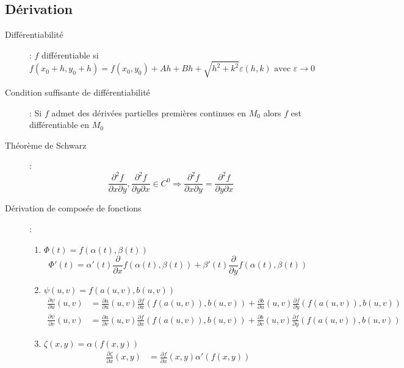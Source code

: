 \subsection{Dérivation}
\begin{description}
\item[Différentiabilité] : $f$ différentiable si
    \[
        f(x_0+h,y_0+h)=
        f(x_0,y_0)+Ah+Bh+\sqrt{h^2+k^2}\varepsilon(h,k)
        \textrm{ avec }
        \varepsilon\longrightarrow 0
    \]
\item[Condition suffisante de différentiabilité] : Si $f$ admet des dérivées partielles premières continues en $M_0$
    alors $f$ est différentiable en $M_0$
\item[Théorème de Schwarz] :
    \[
        \frac{\partial^2f}{\partial x\partial y},
        \frac{\partial^2f}{\partial y\partial x}
        \in C^0
        \Rightarrow
        \frac{\partial^2f}{\partial x\partial y}=
        \frac{\partial^2f}{\partial y\partial x}
    \]
\item[Dérivation de composée de fonctions] :
\begin{enumerate}
    \item $\Phi(t)=f(\alpha(t),\beta(t))$
        \[
            \Phi'(t)=
            \alpha'(t)\frac{\partial}{\partial x}
            f(\alpha(t),\beta(t))
            +
            \beta'(t)\frac{\partial}{\partial y}
            f(\alpha(t),\beta(t))
        \]
    \item $\psi(u,v)=f(a(u,v),b(u,v))$
        \begin{align*}
            \frac{\partial\psi}{\partial u}(u,v)
            &=
            \frac{\partial a}{\partial u}(u,v)
            \frac{\partial f}{\partial x}(f(a(u,v)),b(u,v))
            +
            \frac{\partial b}{\partial u}(u,v)
            \frac{\partial f}{\partial y}(f(a(u,v)),b(u,v))\\
            \frac{\partial\psi}{\partial v}(u,v)
            &=
            \frac{\partial a}{\partial v}(u,v)
            \frac{\partial f}{\partial x}(f(a(u,v)),b(u,v))
            +
            \frac{\partial b}{\partial v}(u,v)
            \frac{\partial f}{\partial y}(f(a(u,v)),b(u,v))
        \end{align*}
    \item $\zeta(x,y)=\alpha(f(x,y))$
        \begin{align*}
            \frac{\partial\zeta}{\partial x}(x,y)
            &=
            \frac{\partial f}{\partial x}(x,y)
            \alpha'(f(x,y))\\

\end{align*}
\end{enumerate}
\end{description}
